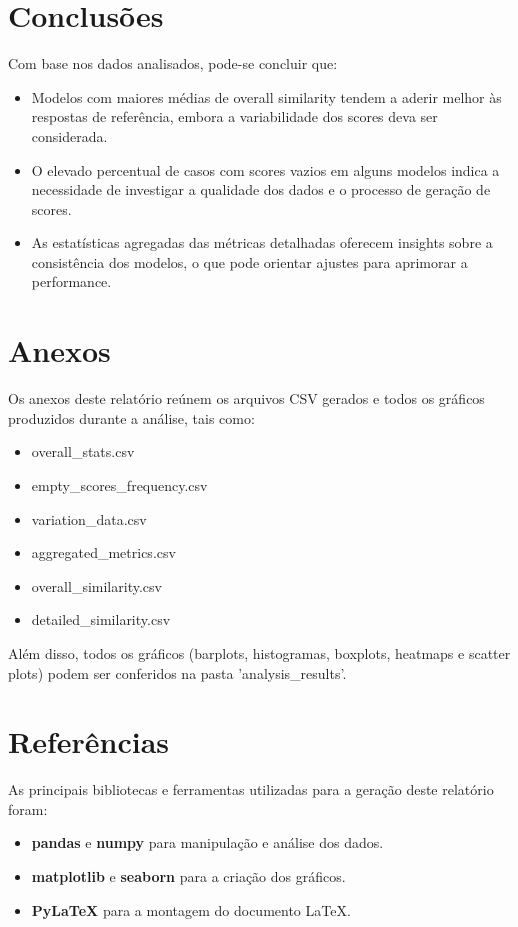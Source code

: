\documentclass{article}%
\begin{document}
%
\section*{Conclusões}%
\label{sec:Concluses}%

Com base nos dados analisados, pode-se concluir que:
\begin{itemize}
    \item Modelos com maiores médias de overall similarity tendem a aderir melhor às respostas de referência, embora a variabilidade dos scores deva ser considerada.
    \item O elevado percentual de casos com scores vazios em alguns modelos indica a necessidade de investigar a qualidade dos dados e o processo de geração de scores.
    \item As estatísticas agregadas das métricas detalhadas oferecem insights sobre a consistência dos modelos, o que pode orientar ajustes para aprimorar a performance.
\end{itemize}

%
\section*{Anexos}%
\label{sec:Anexos}%
Os anexos deste relatório reúnem os arquivos CSV gerados e todos os gráficos produzidos durante a análise, tais como:%
\begin{itemize}%
\item overall\_stats.csv%
\item empty\_scores\_frequency.csv%
\item variation\_data.csv%
\item aggregated\_metrics.csv%
\item overall\_similarity.csv%
\item detailed\_similarity.csv%
\end{itemize}%
Além disso, todos os gráficos (barplots, histogramas, boxplots, heatmaps e scatter plots) podem ser conferidos na pasta 'analysis\_results'.

%
\section*{Referências}%
\label{sec:Referncias}%
As principais bibliotecas e ferramentas utilizadas para a geração deste relatório foram:%
\begin{itemize}%
\item \textbf{pandas} e \textbf{numpy} para manipulação e análise dos dados.%
\item \textbf{matplotlib} e \textbf{seaborn} para a criação dos gráficos.%
\item \textbf{PyLaTeX} para a montagem do documento LaTeX.%
\end{itemize}

%
\end{document}
